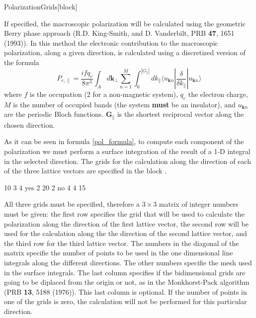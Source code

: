 \begin{fdfentry}{PolarizationGrids}[block]

  If specified, the macroscopic polarization will be calculated using
  the geometric Berry phase approach (R.D. King-Smith, and
  D. Vanderbilt, PRB \textbf{47}, 1651 (1993)). In this method the
  electronic contribution to the macroscopic polarization, along a
  given direction, is calculated using a discretized version of the
  formula
  \begin{equation}
    \label{pol_formula}
    P_{e,\parallel}=\frac{ifq_e}{8\pi^3} \int_A d\mathbf{k}_\perp
    \sum_{n=1}^M \int_0^{|G_\parallel|} dk_{\parallel}
    \langle u_{\mathbf{k} n} |\frac\delta{\delta k_{\parallel}} |
    u_{\mathbf{k} n} \rangle
  \end{equation}
  where $f$ is the occupation (2 for a non-magnetic system), $q_e$ the
  electron charge, $M$ is the number of occupied bands (the system
  \textbf{must} be an insulator), and $u_{\mathbf{k} n}$ are the
  periodic Bloch functions. $\mathbf{G}_\parallel$ is the shortest
  reciprocal vector along the chosen direction.

  As it can be seen in formula \eqref{pol_formula}, to compute each
  component of the polarization we must perform a surface integration
  of the result of a 1-D integral in the selected direction.  The
  grids for the calculation along the direction of each of the three
  lattice vectors are specified in the block .
  \begin{fdfexample}
        10   3  4      yes
         2  20  2       no
         4   4 15
  \end{fdfexample}

  All three grids must be specified, therefore a $3\times3$ matrix of
  integer numbers must be given: the first row specifies the grid that
  will be used to calculate the polarization along the direction of
  the first lattice vector, the second row will be used for the
  calculation along the the direction of the second lattice vector,
  and the third row for the third lattice vector.  The numbers in the
  diagonal of the matrix specifie the number of points to be used in
  the one dimensional line integrals along the different
  directions. The other numbers specifie the mesh used in the surface
  integrals.  The last column specifies if the bidimensional grids are
  going to be diplaced from the origin or not, as in the
  Monkhorst-Pack algorithm (PRB \textbf{13}, 5188 (1976)).  This last
  column is optional.  If the number of points in one of the grids is
  zero, the calculation will not be performed for this particular
  direction.


\end{fdfentry}
